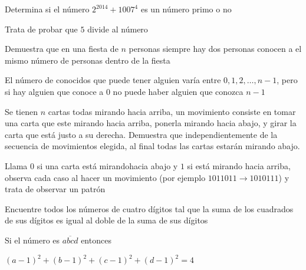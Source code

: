 \documentclass[11pt]{scrartcl}
\begin{document}
\begin{problem}
Determina si el número $2^{2014}+1007^4$ es un número primo o no
  \begin{hint}
 Trata de probar que $5$ divide al número
  \end{hint}
\end{problem}
\vspace{0.1cm}
\begin{problem}
[Clásico] Demuestra que en una fiesta de $n$ personas siempre hay dos personas conocen a el mismo número de personas dentro de la fiesta
  \begin{hint}
  El número de conocidos que puede tener alguien varía entre $0,1,2,\ldots, n-1$, pero si hay alguien que conoce a $0$ no puede haber alguien que conozca $n-1$
  \end{hint}
\end{problem}
\vspace{0.1cm}
\begin{problem}
Se tienen $n$ cartas todas mirando hacia arriba, un movimiento consiste en tomar una carta que este mirando hacia arriba, ponerla mirando hacia abajo, y girar la carta que está justo a su derecha. Demuestra que independientemente de la secuencia de movimientos elegida, al final todas las cartas estarán mirando abajo.
  \begin{hint}
 Llama $0$ si una carta está mirandohacia abajo y $1$ si está mirando hacia arriba, observa cada caso al hacer un movimiento (por ejemplo $101\boxed{10}11\rightarrow 101\boxed{01}11$) y trata de observar un patrón
  \end{hint}
\end{problem}
\vspace{0.1cm}

\begin{problem}
Encuentre todos los números de cuatro dígitos tal que la suma de los cuadrados de sus dígitos es igual al doble de la suma de sus dígitos
\begin{hint}
Si el número es $\overline{abcd}$ entonces 
\begin{center}
    $(a-1)^2+(b-1)^2+(c-1)^2+(d-1)^2=4$
\end{center}
  \end{hint}
\end{problem}
\vspace{0.1cm}
\end{document}
